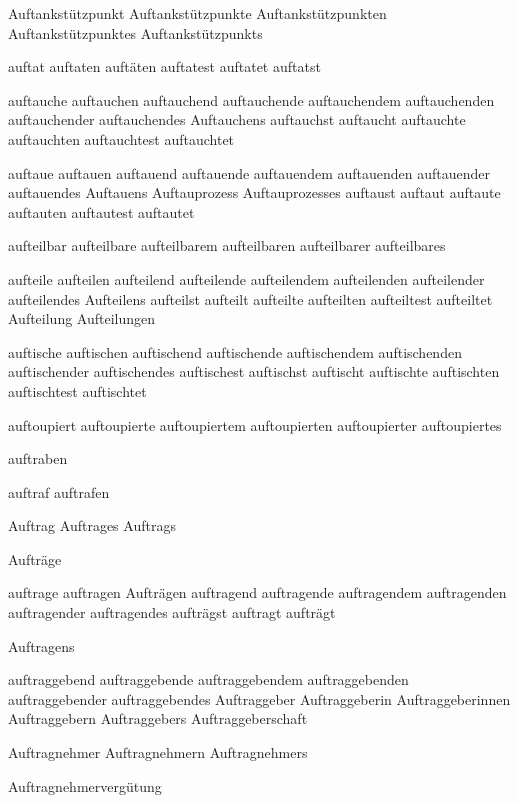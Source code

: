 Auftankstützpunkt
Auftankstützpunkte
Auftankstützpunkten
Auftankstützpunktes
Auftankstützpunkts

auftat
auftaten
auftäten
auftatest
auftatet
auftatst

auftauche
auftauchen
auftauchend
auftauchende
auftauchendem
auftauchenden
auftauchender
auftauchendes
Auftauchens
auftauchst
auftaucht
auftauchte
auftauchten
auftauchtest
auftauchtet

auftaue
auftauen
auftauend
auftauende
auftauendem
auftauenden
auftauender
auftauendes
Auftauens
Auftauprozess
Auftauprozesses
auftaust
auftaut
auftaute
auftauten
auftautest
auftautet

aufteilbar
aufteilbare
aufteilbarem
aufteilbaren
aufteilbarer
aufteilbares

aufteile
aufteilen
aufteilend
aufteilende
aufteilendem
aufteilenden
aufteilender
aufteilendes
Aufteilens
aufteilst
aufteilt
aufteilte
aufteilten
aufteiltest
aufteiltet
Aufteilung
Aufteilungen

auftische
auftischen
auftischend
auftischende
auftischendem
auftischenden
auftischender
auftischendes
auftischest
auftischst
auftischt
auftischte
auftischten
auftischtest
auftischtet

auftoupiert
auftoupierte
auftoupiertem
auftoupierten
auftoupierter
auftoupiertes

auftraben

auftraf
auftrafen

Auftrag
Auftrages
Auftrags

Aufträge

auftrage
auftragen
Aufträgen
auftragend
auftragende
auftragendem
auftragenden
auftragender
auftragendes
aufträgst
auftragt
aufträgt

Auftragens

auftraggebend
auftraggebende
auftraggebendem
auftraggebenden
auftraggebender
auftraggebendes
Auftraggeber
Auftraggeberin
Auftraggeberinnen
Auftraggebern
Auftraggebers
Auftraggeberschaft

Auftragnehmer
Auftragnehmern
Auftragnehmers

Auftragnehmervergütung

